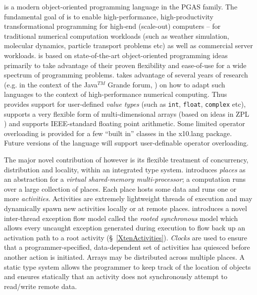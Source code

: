 \Xten{} is a modern object-oriented programming language
in the PGAS family. The fundamental goal of \Xten{} is to enable
high-performance, high-productivity transformational programming for
high-end (scale-out) computers -- for traditional numerical
computation workloads (such as weather simulation, molecular dynamics,
particle transport problems etc) as well as commercial server
workloads. 
\Xten{} is based on state-of-the-art object-oriented
programming ideas primarily to take advantage of their proven
flexibility and ease-of-use for a wide spectrum of programming
problems. \Xten{} takes advantage of several years of research (e.g.{}
in the context of the Java$^{TM}$ Grande forum,
\cite{moreira00java,kava}) on how to adapt such languages to the context of
high-performance numerical computing. Thus \Xten{} provides support
for user-defined {\em value types} (such as {\tt int}, {\tt float},
{\tt complex} etc), supports a very
flexible form of multi-dimensional arrays (based on ideas in ZPL
\cite{zpl}) and supports IEEE-standard floating point arithmetic.
Some limited operator overloading is provided for a few ``built in''
classes in the {\cf x10.lang} package.  Future versions of the
language will support user-definable operator overloading.

The major novel contribution of \Xten{} however is its flexible
treatment of concurrency, distribution and locality, within an
integrated type system. \Xten{} introduces {\em places} as an
abstraction for a {\em virtual shared-memory multi-processor}; a
computation runs over a large collection of places. Each place hosts
some data and runs one or more {\em activities}. Activities are
extremely lightweight threads of execution and may dynamically spawn
new activities locally or at remote places. \Xten{} introduces a novel
inter-thread exception flow model called the {\em rooted synchronous}
model which allows every uncaught exception generated during execution
to flow back up an activation path to a root activity
(\S~\ref{XtenActivities}).  {\em Clocks} are used to ensure that a
programmer-specified, data-dependent set of activities has quiesced
before another action is initiated. Arrays may be distributed across
multiple places. A static type system allows the programmer to keep
track of the location of objects and ensures statically that an
activity does not synchronously attempt to read/write remote data.

